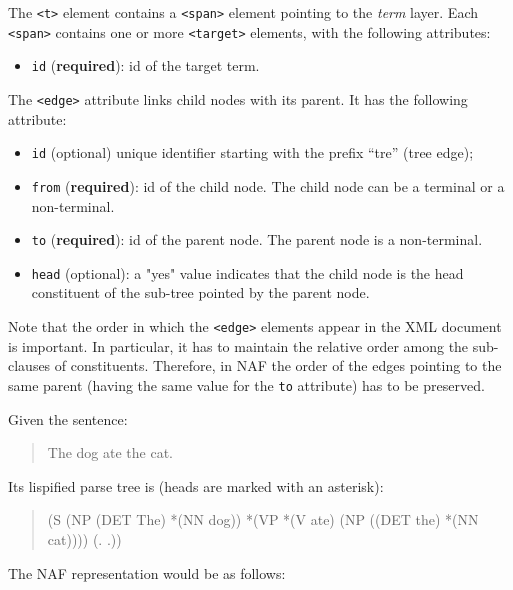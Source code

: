 The \texttt{<t>} element contains a \texttt{<span>} element pointing to the
\emph{term} layer.  Each \texttt{<span>} contains one or more
\texttt{<target>} elements, with the following attributes:

\begin{itemize}
\item \texttt{id} (\textbf{required}): id of the target term.
\end{itemize}

The \texttt{<edge>} attribute links child nodes with its parent. It has the
following attribute:

\begin{itemize}
\item \texttt{id} (optional) unique identifier starting with the
  prefix ``tre'' (tree edge);
\item \texttt{from} (\textbf{required}): id of the child node. The child node can be a terminal
  or a non-terminal.
\item \texttt{to} (\textbf{required}): id of the parent node. The parent
  node is a non-terminal.
\item \texttt{head} (optional): a "yes" value indicates that the child node
  is the head constituent of the sub-tree pointed by the parent node.
\end{itemize}

Note that the order in which the \texttt{<edge>} elements appear in the XML
document is important. In particular, it has to maintain the relative order
among the sub-clauses of constituents. Therefore, in NAF the order of the
edges pointing to the same parent (having the same value for the \texttt{to}
attribute) has to be preserved.

Given the sentence:

\begin{quote}
  The dog ate the cat.  
\end{quote}

Its lispified parse tree is (heads are marked with an asterisk):
\begin{quote}
  (S (NP (DET The) *(NN dog)) *(VP *(V ate) (NP ((DET the) *(NN cat)))) (. .))
\end{quote}

The NAF representation would be as follows:

